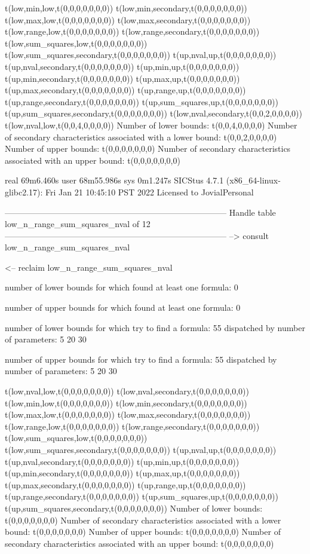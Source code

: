 t(low,min,low,t(0,0,0,0,0,0,0))
t(low,min,secondary,t(0,0,0,0,0,0,0))
t(low,max,low,t(0,0,0,0,0,0,0))
t(low,max,secondary,t(0,0,0,0,0,0,0))
t(low,range,low,t(0,0,0,0,0,0,0))
t(low,range,secondary,t(0,0,0,0,0,0,0))
t(low,sum_squares,low,t(0,0,0,0,0,0,0))
t(low,sum_squares,secondary,t(0,0,0,0,0,0,0))
t(up,nval,up,t(0,0,0,0,0,0,0))
t(up,nval,secondary,t(0,0,0,0,0,0,0))
t(up,min,up,t(0,0,0,0,0,0,0))
t(up,min,secondary,t(0,0,0,0,0,0,0))
t(up,max,up,t(0,0,0,0,0,0,0))
t(up,max,secondary,t(0,0,0,0,0,0,0))
t(up,range,up,t(0,0,0,0,0,0,0))
t(up,range,secondary,t(0,0,0,0,0,0,0))
t(up,sum_squares,up,t(0,0,0,0,0,0,0))
t(up,sum_squares,secondary,t(0,0,0,0,0,0,0))
t(low,nval,secondary,t(0,0,2,0,0,0,0))
t(low,nval,low,t(0,0,4,0,0,0,0))
Number of lower bounds:                                             t(0,0,4,0,0,0,0)
Number of secondary characteristics associated with a lower bound:  t(0,0,2,0,0,0,0)
Number of upper bounds:                                             t(0,0,0,0,0,0,0)
Number of secondary characteristics associated with an upper bound: t(0,0,0,0,0,0,0)

real	69m6.460s
user	68m55.986s
sys	0m1.247s
SICStus 4.7.1 (x86_64-linux-glibc2.17): Fri Jan 21 10:45:10 PST 2022
Licensed to JovialPersonal


--------------------------------------------------------------------------------
Handle table low_n_range_sum_squares_nval of 12
--------------------------------------------------------------------------------
--> consult low_n_range_sum_squares_nval

<-- reclaim low_n_range_sum_squares_nval

number of lower bounds for which found at least one formula: 0

number of upper bounds for which found at least one formula: 0

number of lower bounds for which try to find a formula: 55
dispatched by number of parameters: 5  20  30

number of upper bounds for which try to find a formula: 55
dispatched by number of parameters: 5  20  30

t(low,nval,low,t(0,0,0,0,0,0,0))
t(low,nval,secondary,t(0,0,0,0,0,0,0))
t(low,min,low,t(0,0,0,0,0,0,0))
t(low,min,secondary,t(0,0,0,0,0,0,0))
t(low,max,low,t(0,0,0,0,0,0,0))
t(low,max,secondary,t(0,0,0,0,0,0,0))
t(low,range,low,t(0,0,0,0,0,0,0))
t(low,range,secondary,t(0,0,0,0,0,0,0))
t(low,sum_squares,low,t(0,0,0,0,0,0,0))
t(low,sum_squares,secondary,t(0,0,0,0,0,0,0))
t(up,nval,up,t(0,0,0,0,0,0,0))
t(up,nval,secondary,t(0,0,0,0,0,0,0))
t(up,min,up,t(0,0,0,0,0,0,0))
t(up,min,secondary,t(0,0,0,0,0,0,0))
t(up,max,up,t(0,0,0,0,0,0,0))
t(up,max,secondary,t(0,0,0,0,0,0,0))
t(up,range,up,t(0,0,0,0,0,0,0))
t(up,range,secondary,t(0,0,0,0,0,0,0))
t(up,sum_squares,up,t(0,0,0,0,0,0,0))
t(up,sum_squares,secondary,t(0,0,0,0,0,0,0))
Number of lower bounds:                                             t(0,0,0,0,0,0,0)
Number of secondary characteristics associated with a lower bound:  t(0,0,0,0,0,0,0)
Number of upper bounds:                                             t(0,0,0,0,0,0,0)
Number of secondary characteristics associated with an upper bound: t(0,0,0,0,0,0,0)

